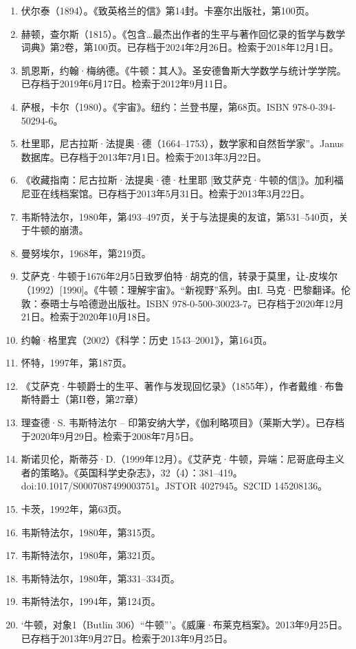 \begin{enumerate}
\item 伏尔泰（1894）。《致英格兰的信》第14封。卡塞尔出版社，第100页。  
\item 赫顿，查尔斯（1815）。《包含…最杰出作者的生平与著作回忆录的哲学与数学词典》第2卷，第100页。已存档于2024年2月26日。检索于2018年12月1日。  
\item 凯恩斯，约翰·梅纳德。《牛顿：其人》。圣安德鲁斯大学数学与统计学学院。已存档于2019年6月17日。检索于2012年9月11日。  
\item 萨根，卡尔（1980）。《宇宙》。纽约：兰登书屋，第68页。ISBN 978-0-394-50294-6。
\item 杜里耶，尼古拉斯·法提奥·德（1664–1753），数学家和自然哲学家”。Janus数据库。已存档于2013年7月1日。检索于2013年3月22日。  
\item 《收藏指南：尼古拉斯·法提奥·德·杜里耶 [致艾萨克·牛顿的信]》。加利福尼亚在线档案馆。已存档于2013年5月31日。检索于2013年3月22日。  
\item 韦斯特法尔，1980年，第493–497页，关于与法提奥的友谊，第531–540页，关于牛顿的崩溃。  
\item 曼努埃尔，1968年，第219页。  
\item 艾萨克·牛顿于1676年2月5日致罗伯特·胡克的信，转录于莫里，让-皮埃尔（1992）[1990]。《牛顿：理解宇宙》。“新视野”系列。由I. 马克·巴黎翻译。伦敦：泰晤士与哈德逊出版社。ISBN 978-0-500-30023-7。已存档于2020年12月21日。检索于2020年10月18日。
\item 约翰·格里宾（2002）《科学：历史 1543–2001》，第164页。  
\item 怀特，1997年，第187页。  
\item 《艾萨克·牛顿爵士的生平、著作与发现回忆录》（1855年），作者戴维·布鲁斯特爵士（第II卷，第27章）  
\item 理查德·S. 韦斯特法尔 – 印第安纳大学，《伽利略项目》（莱斯大学）。已存档于2020年9月29日。检索于2008年7月5日。  
\item 斯诺贝伦，斯蒂芬·D.（1999年12月）。《艾萨克·牛顿，异端：尼哥底母主义者的策略》。《英国科学史杂志》，32（4）：381–419。doi:10.1017/S0007087499003751。JSTOR 4027945。S2CID 145208136。  
\item 卡茨，1992年，第63页。  
\item 韦斯特法尔，1980年，第315页。  
\item 韦斯特法尔，1980年，第321页。  
\item 韦斯特法尔，1980年，第331–334页。  
\item 韦斯特法尔，1994年，第124页。
\item ‘牛顿，对象1（Butlin 306）“牛顿”’。《威廉·布莱克档案》。2013年9月25日。已存档于2013年9月27日。检索于2013年9月25日。  

\end{enumerate}
